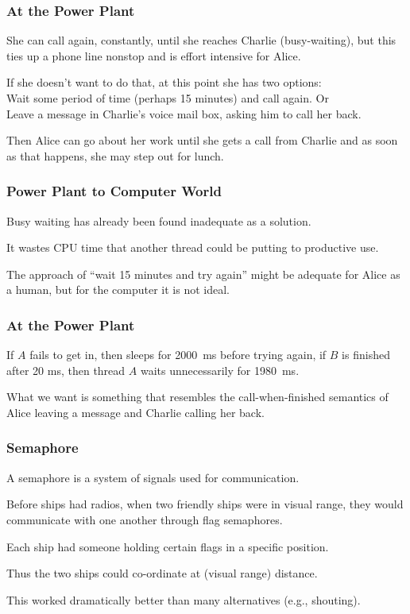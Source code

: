 \begin{frame}
	\frametitle{At the Power Plant}
	She can call again, constantly, until she reaches Charlie (busy-waiting), but this ties up a phone line nonstop and is effort intensive for Alice.

	If she doesn't want to do that, at this point she has two options:\\
	\quad Wait some period of time (perhaps 15 minutes) and call again. Or\\
	\quad Leave a message in Charlie's voice mail box, asking him to call her back.

	Then Alice can go about her work until she gets a call from Charlie and as soon as that happens, she may step out for lunch.


\end{frame}

\begin{frame}
	\frametitle{Power Plant to Computer World}

	Busy waiting has already been found inadequate as a solution.

	It wastes CPU time that another thread could be putting to productive use.

	The approach of ``wait 15 minutes and try again'' might be adequate for Alice as a human, but for the computer it is not ideal.
	
\end{frame}

\begin{frame}
	\frametitle{At the Power Plant}

	If $A$ fails to get in, then sleeps for 2000~ms before trying again, if $B$ is finished after 20 ms, then thread $A$ waits unnecessarily for 1980~ms.

	What we want is something that resembles the call-when-finished semantics of Alice leaving a message and Charlie calling her back.

\end{frame}

\begin{frame}
	\frametitle{Semaphore}

	A semaphore is a system of signals used for communication.

	Before ships had radios, when two friendly ships were in visual range, they would communicate with one another through flag semaphores.

	Each ship had someone holding certain flags in a specific position.

	Thus the two ships could co-ordinate at (visual range) distance.

	This worked dramatically better than many alternatives (e.g., shouting).

\end{frame}


